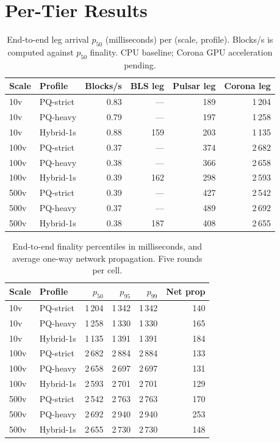 \documentclass[11pt,a4paper]{article}
\begin{document}
\section{Per-Tier Results}

\begin{table}[h]
\centering
\small
\begin{tabular}{@{}llrrrr@{}}
\toprule
\textbf{Scale} & \textbf{Profile} & \textbf{Blocks/s} & \textbf{BLS leg} & \textbf{Pulsar leg} & \textbf{Corona leg} \\
\midrule
10v   & PQ-strict & 0.83 & --- & 189 & 1\,204 \\
10v   & PQ-heavy  & 0.79 & --- & 197 & 1\,258 \\
10v   & Hybrid-1s & 0.88 & 159 & 203 & 1\,135 \\
\midrule
100v  & PQ-strict & 0.37 & --- & 374 & 2\,682 \\
100v  & PQ-heavy  & 0.38 & --- & 366 & 2\,658 \\
100v  & Hybrid-1s & 0.39 & 162 & 298 & 2\,593 \\
\midrule
500v  & PQ-strict & 0.39 & --- & 427 & 2\,542 \\
500v  & PQ-heavy  & 0.37 & --- & 489 & 2\,692 \\
500v  & Hybrid-1s & 0.38 & 187 & 408 & 2\,655 \\
\bottomrule
\end{tabular}
\caption{End-to-end leg arrival $p_{50}$ (milliseconds) per
(scale, profile). Blocks/s is computed against $p_{50}$ finality.
CPU baseline; Corona GPU acceleration pending.}
\label{tab:results}
\end{table}

\begin{table}[h]
\centering
\small
\begin{tabular}{@{}llrrrr@{}}
\toprule
\textbf{Scale} & \textbf{Profile} & \textbf{$p_{50}$} & \textbf{$p_{95}$} & \textbf{$p_{99}$} & \textbf{Net prop} \\
\midrule
10v   & PQ-strict & 1\,204 & 1\,342 & 1\,342 & 140 \\
10v   & PQ-heavy  & 1\,258 & 1\,330 & 1\,330 & 165 \\
10v   & Hybrid-1s & 1\,135 & 1\,391 & 1\,391 & 184 \\
100v  & PQ-strict & 2\,682 & 2\,884 & 2\,884 & 133 \\
100v  & PQ-heavy  & 2\,658 & 2\,697 & 2\,697 & 131 \\
100v  & Hybrid-1s & 2\,593 & 2\,701 & 2\,701 & 129 \\
500v  & PQ-strict & 2\,542 & 2\,763 & 2\,763 & 170 \\
500v  & PQ-heavy  & 2\,692 & 2\,940 & 2\,940 & 253 \\
500v  & Hybrid-1s & 2\,655 & 2\,730 & 2\,730 & 148 \\
\bottomrule
\end{tabular}
\caption{End-to-end finality percentiles in milliseconds, and
average one-way network propagation. Five rounds per cell.}
\label{tab:percentiles}
\end{table}
\end{document}
